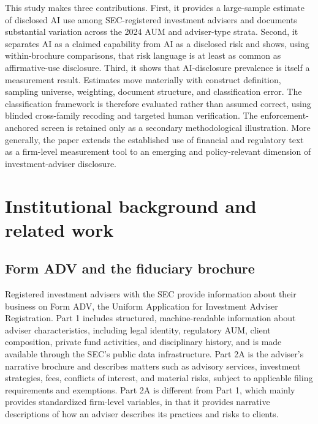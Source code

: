 \documentclass[utf8]{FrontiersinHarvard}
\begin{document}
This study makes three contributions. First, it provides a large-sample estimate of disclosed AI use among SEC-registered investment advisers and documents substantial variation across the 2024 AUM and adviser-type strata. Second, it separates AI as a claimed capability from AI as a disclosed risk and shows, using within-brochure comparisons, that risk language is at least as common as affirmative-use disclosure. Third, it shows that AI-disclosure prevalence is itself a measurement result. Estimates move materially with construct definition, sampling universe, weighting, document structure, and classification error. The classification framework is therefore evaluated rather than assumed correct, using blinded cross-family recoding and targeted human verification. The enforcement-anchored screen is retained only as a secondary methodological illustration. More generally, the paper extends the established use of financial and regulatory text as a firm-level measurement tool \citep{tetlock2007,loughran2011,hoberg2016,cohenLazy2020,abis2022} to an emerging and policy-relevant dimension of investment-adviser disclosure.

\section{Institutional background and related work}

\subsection{Form ADV and the fiduciary brochure}

Registered investment advisers with the SEC provide information about their business on Form ADV, the Uniform Application for Investment Adviser Registration. Part 1 includes structured, machine-readable information about adviser characteristics, including legal identity, regulatory AUM, client composition, private fund activities, and disciplinary history, and is made available through the SEC's public data infrastructure. Part 2A is the adviser's narrative brochure and describes matters such as advisory services, investment strategies, fees, conflicts of interest, and material risks, subject to applicable filing requirements and exemptions. Part 2A is different from Part 1, which mainly provides standardized firm-level variables, in that it provides narrative descriptions of how an adviser describes its practices and risks to clients.
\end{document}
